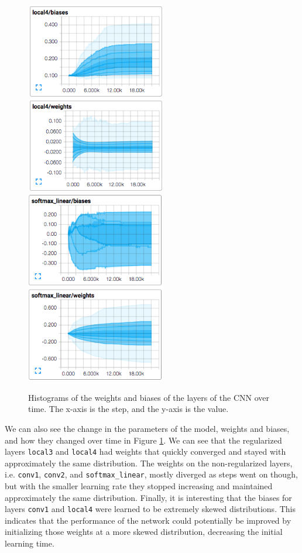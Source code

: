 \documentclass[10pt, twocolumn, twoside]{article}
\begin{document}
\begin{figure}
	\includegraphics[width=2.4in]{local4_params}
	\includegraphics[width=2.4in]{softmax_params}
	\caption{Histograms of the weights and biases of the layers of the CNN over time. The x-axis is the step, and the y-axis is the value.}
	\label{fig:params}
\end{figure}


We can also see the change in the parameters of the model, weights and biases, and how they changed over time in Figure \ref{fig:params}. We can see that the regularized layers \texttt{local3} and \texttt{local4} had weights that quickly converged and stayed with approximately the same distribution. The weights on the non-regularized layers, i.e. \texttt{conv1}, \texttt{conv2}, and \texttt{softmax\_linear}, mostly diverged as steps went on though, but with the smaller learning rate they stopped increasing and maintained approximately the same distribution. Finally, it is interesting that the biases for layers \texttt{conv1} and \texttt{local4} were learned to be extremely skewed distributions. This indicates that the performance of the network could potentially be improved by initializing those weights at a more skewed distribution, decreasing the initial learning time.
\end{document}
